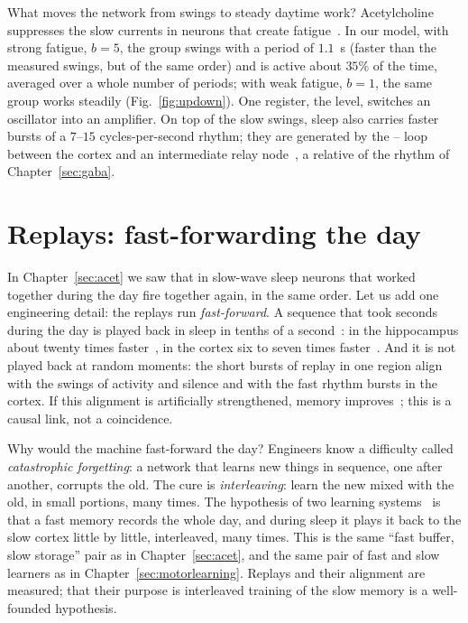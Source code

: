 What moves the network from swings to steady daytime work? Acetylcholine suppresses the slow currents in neurons that create fatigue~\cite{McCormick1992}. In our model, with strong fatigue, $b=5$, the group swings with a period of $1.1$~s (faster than the measured swings, but of the same order) and is active about $35\%$ of the time, averaged over a whole number of periods; with weak fatigue, $b=1$, the same group works steadily (Fig.~\ref{fig:updown}). One register, the  level, switches an oscillator into an amplifier. On top of the slow swings, sleep also carries faster bursts of a $7$--$15$ cycles-per-second rhythm; they are generated by the -- loop between the cortex and an intermediate relay node~\cite{SteriadeMcCormickSejnowski1993}, a relative of the rhythm of Chapter~\ref{sec:gaba}.

\section{Replays: fast-forwarding the day}

In Chapter~\ref{sec:acet} we saw that in slow-wave sleep neurons that worked together during the day fire together again, in the same order. Let us add one engineering detail: the replays run \emph{fast-forward}. A sequence that took seconds during the day is played back in sleep in tenths of a second~\cite{Nadasdy1999}: in the hippocampus about twenty times faster~\cite{LeeWilson2002}, in the cortex six to seven times faster~\cite{Euston2007}. And it is not played back at random moments: the short bursts of replay in one region align with the swings of activity and silence and with the fast rhythm bursts in the cortex. If this alignment is artificially strengthened, memory improves~\cite{Maingret2016}; this is a causal link, not a coincidence.

Why would the machine fast-forward the day? Engineers know a difficulty called \emph{catastrophic forgetting}: a network that learns new things in sequence, one after another, corrupts the old. The cure is \emph{interleaving}: learn the new mixed with the old, in small portions, many times. The hypothesis of two learning systems~\cite{McClelland1995} is that a fast memory records the whole day, and during sleep it plays it back to the slow cortex little by little, interleaved, many times. This is the same ``fast buffer, slow storage'' pair as in Chapter~\ref{sec:acet}, and the same pair of fast and slow learners as in Chapter~\ref{sec:motorlearning}. Replays and their alignment are measured; that their purpose is interleaved training of the slow memory is a well-founded hypothesis.

